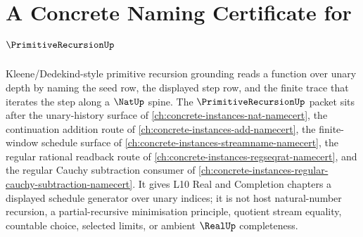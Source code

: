 \chapter{A Concrete Naming Certificate for $\PrimitiveRecursionUp$}
\label{ch:concrete-instances-primitive-recursion-namecert}

Kleene/Dedekind-style primitive recursion grounding reads a function over unary depth by naming the seed row, the displayed step row, and the finite trace that iterates the step along a $\NatUp$ spine. The $\PrimitiveRecursionUp$ packet sits after the unary-history surface of \autoref{ch:concrete-instances-nat-namecert}, the continuation addition route of \autoref{ch:concrete-instances-add-namecert}, the finite-window schedule surface of \autoref{ch:concrete-instances-streamname-namecert}, the regular rational readback route of \autoref{ch:concrete-instances-regseqrat-namecert}, and the regular Cauchy subtraction consumer of \autoref{ch:concrete-instances-regular-cauchy-subtraction-namecert}. It gives L10 Real and Completion chapters a displayed schedule generator over unary indices; it is not host natural-number recursion, a partial-recursive minimisation principle, quotient stream equality, countable choice, selected limits, or ambient $\RealUp$ completeness.

